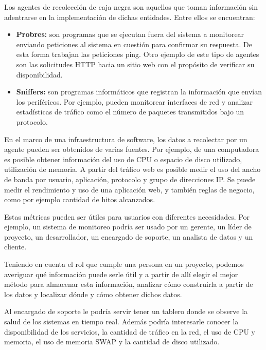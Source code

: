 Los agentes de recolección de caja negra son aquellos que toman información sin adentrarse en la implementación de dichas entidades. Entre ellos se encuentran:

\begin{itemize}
  \item \textbf{Probres:} son programas que se ejecutan fuera del sistema a monitorear enviando peticiones al sistema en cuestión para confirmar su respuesta. De esta forma trabajan las peticiones ping. Otro ejemplo de este tipo de agentes son las solicitudes HTTP hacia un sitio web con el propósito de verificar su disponibilidad.

  \item \textbf{Sniffers:} son programas informáticos que registran la información que envían los periféricos. Por ejemplo, pueden monitorear interfaces de red y analizar estadísticas de tráfico como el número de paquetes transmitidos bajo un protocolo. \cite[p.~15-16]{monitoreo:efective_monitoring_and_alerting}
\end{itemize}

En el marco de una infraestructura de software, los datos a recolectar por un agente pueden ser obtenidos de varias fuentes. Por ejemplo, de una computadora es posible obtener información del uso de CPU o espacio de disco utilizado, utilización de memoria. A partir del tráfico web es posible medir el uso del ancho de banda por usuario, aplicación, protocolo y grupo de direcciones IP. Se puede medir el rendimiento y uso de una aplicación web, y también reglas de negocio, como por ejemplo cantidad de hitos alcanzados.

Estas métricas pueden ser útiles para usuarios con diferentes necesidades. Por ejemplo, un sistema de monitoreo podría ser usado por un gerente, un líder de proyecto, un desarrollador, un encargado de soporte, un analista de datos y un cliente.

Teniendo en cuenta el rol que cumple una persona en un proyecto, podemos averiguar qué información puede serle útil y a partir de allí elegir el mejor método para almacenar esta información, analizar cómo construirla a partir de los datos y localizar dónde y cómo obtener dichos datos.

Al encargado de soporte le podría servir tener un tablero donde se observe la salud de los sistemas en tiempo real. Además podría interesarle conocer la disponibilidad de los servicios, la cantidad de tráfico en la red, el uso de CPU y memoria, el uso de memoria SWAP y la cantidad de disco utilizado.

